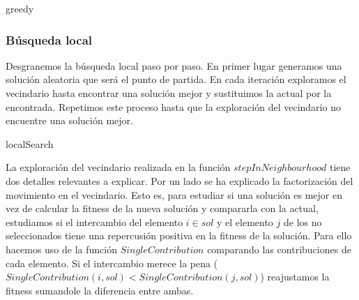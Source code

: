 \documentclass[11pt,a4paper]{article}
\begin{document}
	\begin{algorithm}[H]
		\caption{greedy}
	\end{algorithm}

	\subsubsection{Búsqueda local}
	
	Desgranemos la búsqueda local paso por paso. En primer lugar generamos una solución aleatoria que será el punto de partida. En cada iteración exploramos el vecindario hasta encontrar una solución mejor y sustituimos la actual por la encontrada. Repetimos este proceso hasta que la exploración del vecindario no encuentre una solución mejor. \\
	
	\begin{algorithm}[H]
		\caption{localSearch}
	\end{algorithm}

	La exploración del vecindario realizada en la función $stepInNeighbourhood$ tiene dos detalles relevantes a explicar. Por un lado se ha explicado la factorización del movimiento en el vecindario. Esto es, para estudiar si una solución es mejor en vez de calcular la fitness de la nueva solución y compararla con la actual, estudiamos si el intercambio del elemento $i \in sol$ y el elemento $j$ de los no seleccionados tiene una repercusión positiva en la fitness de la solución. Para ello hacemos uso de la función $SingleContribution$ comparando las contribuciones de cada elemento. Si el intercambio merece la pena ($SingleContribution(i,sol) < SingleContribution(j,sol)$) reajustamos la fitness sumandole la diferencia entre ambas. \\
	
\end{document}
